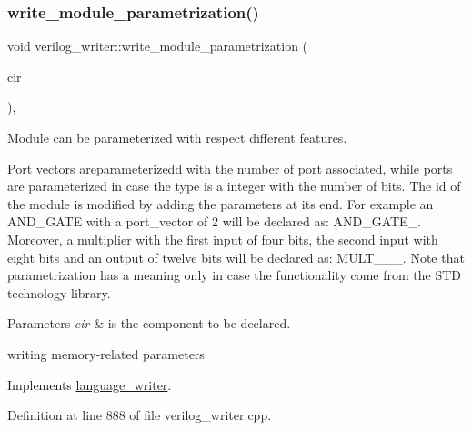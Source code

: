 \subsubsection{\texorpdfstring{write\+\_\+module\+\_\+parametrization()}{write\_module\_parametrization()}}
{\footnotesize\ttfamily void verilog\+\_\+writer\+::write\+\_\+module\+\_\+parametrization (\begin{DoxyParamCaption}\item[{const \hyperlink{structural__objects_8hpp_a8ea5f8cc50ab8f4c31e2751074ff60b2}{structural\+\_\+object\+Ref} \&}]{cir }\end{DoxyParamCaption})\hspace{0.3cm}{\ttfamily [override]}, {\ttfamily [virtual]}}



Module can be parameterized with respect different features. 

Port vectors areparameterizedd with the number of port associated, while ports are parameterized in case the type is a integer with the number of bits. The id of the module is modified by adding the parameters at its end. For example an A\+N\+D\+\_\+\+G\+A\+TE with a port\+\_\+vector of 2 will be declared as\+: A\+N\+D\+\_\+\+G\+A\+T\+E\+\_. Moreover, a multiplier with the first input of four bits, the second input with eight bits and an output of twelve bits will be declared as\+: M\+U\+L\+T\+\_\+\_\+\_. Note that parametrization has a meaning only in case the functionality come from the S\+TD technology library. 
\begin{DoxyParams}{Parameters}
{\em cir} & is the component to be declared. \\
\hline
\end{DoxyParams}
writing memory-\/related parameters 

Implements \hyperlink{classlanguage__writer_a393febaf037080d4a91588cfa699c8cb}{language\+\_\+writer}.



Definition at line 888 of file verilog\+\_\+writer.\+cpp.



